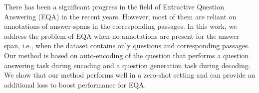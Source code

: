 There has been a significant progress in the field of Extractive Question Answering (EQA) in the recent years. However, most of them are reliant on annotations of answer-spans in the corresponding passages. In this work, we address the problem of EQA when no annotations are present for the answer span, i.e., when the dataset contains only questions and corresponding passages. Our method is based on auto-encoding of the question that performs a question answering task during encoding and a question generation task during decoding. We show that our method performs well in a zero-shot setting and can provide an additional loss to boost performance for EQA.
